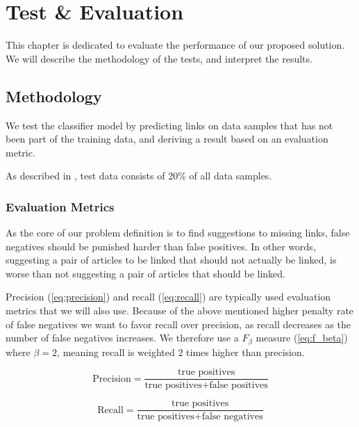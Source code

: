 \chapter{Test \& Evaluation}\label{chap:testeval}
This chapter is dedicated to evaluate the performance of our proposed solution. We will describe the methodology of the tests, and interpret the results.

\section{Methodology}
We test the classifier model by predicting links on data samples that has not been part of the training data, and deriving a result based on an evaluation metric.

As described in , test data consists of 20\% of all data samples. 

\subsection{Evaluation Metrics}
As the core of our problem definition is to find suggestions to missing links, false negatives should be punished harder than false positives. In other words, suggesting a pair of articles to be linked that should not actually be linked, is worse than not suggesting a pair of articles that should be linked. 

Precision (\cref{eq:precision}) and recall (\cref{eq:recall}) are typically used evaluation metrics that we will also use. Because of the above mentioned higher penalty rate of false negatives we want to favor recall over precision, as recall decreases as the number of false negatives increases. We therefore use a $F_\beta$ measure (\cref{eq:f_beta}) where $\beta = 2$, meaning recall is weighted 2 times higher than precision. 

\begin{equation}\label{eq:precision}
\text{Precision} = \frac{\text{true positives}}{\text{true positives} + \text{false positives}}
\end{equation}

\begin{equation}\label{eq:recall}
\text{Recall} = \frac{\text{true positives}}{\text{true positives} + \text{false negatives}}
\end{equation}

